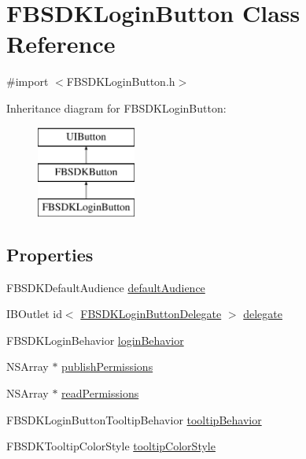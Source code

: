 \hypertarget{interface_f_b_s_d_k_login_button}{}\section{F\+B\+S\+D\+K\+Login\+Button Class Reference}
\label{interface_f_b_s_d_k_login_button}


{\ttfamily \#import $<$F\+B\+S\+D\+K\+Login\+Button.\+h$>$}

Inheritance diagram for F\+B\+S\+D\+K\+Login\+Button\+:\begin{figure}[H]
\begin{center}
\leavevmode
\includegraphics[height=3.000000cm]{interface_f_b_s_d_k_login_button}
\end{center}
\end{figure}
\subsection*{Properties}
\begin{DoxyCompactItemize}
\item 
F\+B\+S\+D\+K\+Default\+Audience \hyperlink{interface_f_b_s_d_k_login_button_a27d7d78187d38c367957bac4b28c7ab6}{default\+Audience}
\item 
I\+B\+Outlet id$<$ \hyperlink{protocol_f_b_s_d_k_login_button_delegate-p}{F\+B\+S\+D\+K\+Login\+Button\+Delegate} $>$ \hyperlink{interface_f_b_s_d_k_login_button_a9334392431c0fb78a08fe4038a2a30fb}{delegate}
\item 
F\+B\+S\+D\+K\+Login\+Behavior \hyperlink{interface_f_b_s_d_k_login_button_afe30ee6f02e53feb1185bea33b5afd8e}{login\+Behavior}
\item 
N\+S\+Array $\ast$ \hyperlink{interface_f_b_s_d_k_login_button_a7b546773564a1961a0e9403e6b48b286}{publish\+Permissions}
\item 
N\+S\+Array $\ast$ \hyperlink{interface_f_b_s_d_k_login_button_a4086baec0d0b3203c6dd3b3d65d419f8}{read\+Permissions}
\item 
F\+B\+S\+D\+K\+Login\+Button\+Tooltip\+Behavior \hyperlink{interface_f_b_s_d_k_login_button_ad8da738c3ec8c6efbdada9547ef09757}{tooltip\+Behavior}
\item 
F\+B\+S\+D\+K\+Tooltip\+Color\+Style \hyperlink{interface_f_b_s_d_k_login_button_af2e1aa50591714452427fc87eade3e5e}{tooltip\+Color\+Style}
\end{DoxyCompactItemize}


